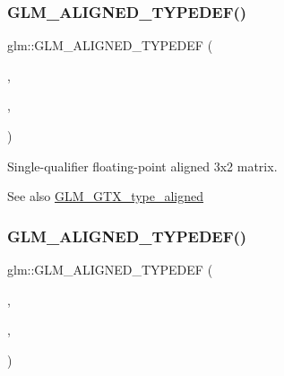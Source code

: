 \subsubsection{\texorpdfstring{G\+L\+M\+\_\+\+A\+L\+I\+G\+N\+E\+D\+\_\+\+T\+Y\+P\+E\+D\+E\+F()}{GLM\_ALIGNED\_TYPEDEF()}\hspace{0.1cm}{\footnotesize\ttfamily [175/209]}}
{\footnotesize\ttfamily glm\+::\+G\+L\+M\+\_\+\+A\+L\+I\+G\+N\+E\+D\+\_\+\+T\+Y\+P\+E\+D\+EF (\begin{DoxyParamCaption}\item[{\hyperlink{group__gtc__type__precision_gaed9c8fe9d2e094bf3bc7c606bbae1a6b}{fmat3x2}}]{,  }\item[{aligned\+\_\+fmat3x2}]{,  }\item[{16}]{ }\end{DoxyParamCaption})}

Single-\/qualifier floating-\/point aligned 3x2 matrix. \begin{DoxySeeAlso}{See also}
\hyperlink{group__gtx__type__aligned}{G\+L\+M\+\_\+\+G\+T\+X\+\_\+type\+\_\+aligned} 
\end{DoxySeeAlso}
\mbox{\label{group__gtx__type__aligned_ga27b13f465abc8a40705698145e222c3f}} 
\subsubsection{\texorpdfstring{G\+L\+M\+\_\+\+A\+L\+I\+G\+N\+E\+D\+\_\+\+T\+Y\+P\+E\+D\+E\+F()}{GLM\_ALIGNED\_TYPEDEF()}\hspace{0.1cm}{\footnotesize\ttfamily [176/209]}}
{\footnotesize\ttfamily glm\+::\+G\+L\+M\+\_\+\+A\+L\+I\+G\+N\+E\+D\+\_\+\+T\+Y\+P\+E\+D\+EF (\begin{DoxyParamCaption}\item[{\hyperlink{group__gtc__type__precision_ga5bf6f06e3cac1ed82489f858a0816aaa}{fmat3x3}}]{,  }\item[{aligned\+\_\+fmat3x3}]{,  }\item[{16}]{ }\end{DoxyParamCaption})}

